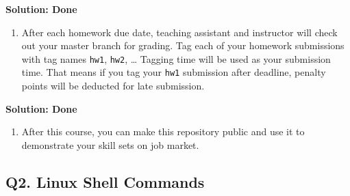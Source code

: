 \documentclass[
]{article}
\providecommand{\tightlist}{%
  \setlength{\itemsep}{0pt}\setlength{\parskip}{0pt}}
\begin{document}
\textbf{Solution: Done}

\begin{enumerate}
\def\labelenumi{\arabic{enumi}.}
\setcounter{enumi}{3}
\tightlist
\item
  After each homework due date, teaching assistant and instructor will
  check out your master branch for grading. Tag each of your homework
  submissions with tag names \texttt{hw1}, \texttt{hw2}, \ldots{}
  Tagging time will be used as your submission time. That means if you
  tag your \texttt{hw1} submission after deadline, penalty points will
  be deducted for late submission.
\end{enumerate}

\textbf{Solution: Done}

\begin{enumerate}
\def\labelenumi{\arabic{enumi}.}
\setcounter{enumi}{4}
\tightlist
\item
  After this course, you can make this repository public and use it to
  demonstrate your skill sets on job market.
\end{enumerate}

\hypertarget{q2.-linux-shell-commands}{%
\subsection{Q2. Linux Shell Commands}\label{q2.-linux-shell-commands}}
\end{document}
